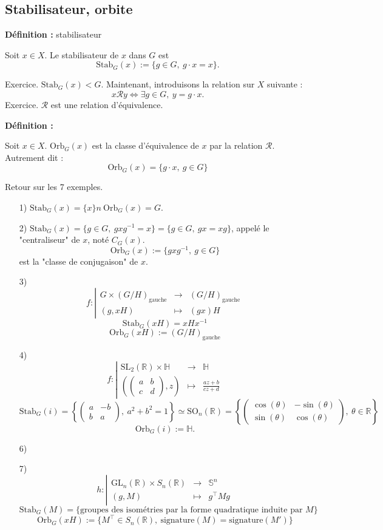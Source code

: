 \documentclass{report}
\newenvironment{definition}[1][]{
    \begin{tcolorbox}[colframe= white]
    \textbf{Définition :} 
    #1 \par
    }
    {\end{tcolorbox}}
\newcommand{\ssi}{\Longleftrightarrow}
\newcommand{\R}{\mathbb{R}}
\newcommand{\mc}{\mathcal}
\newcommand{\D}{\right}
\newcommand{\G}{\left}
\newcommand{\jus}{\ju\vspace{0.5cm}}
\newcommand{\ju}{\justify}
\newcommand{\fonctions}[5]{\begin{displaymath}#1:\left| \begin{array}{ccc}
 #2 & \longrightarrow & #3 \\
    #4 & \longmapsto & #5 \end{array}\right.\end{displaymath}}
\begin{document}
\subsection{Stabilisateur, orbite}
\jus 
\begin{definition}[stabilisateur] 
Soit $x\in X$. Le stabilisateur de $x$ dans $G$ est 
$$\text{Stab}_G(x):=\{g\in G,\ g\cdot x=x\}.$$
\end{definition}
\ju 
Exercice. $\text{Stab}_G(x)<G$. 
\jus 
Maintenant, introduisons la relation sur $X$ suivante : 
$$x\mc{R}y\ssi\exists g\in G,\ y=g\cdot x.$$
\ju 
Exercice. $\mc{R}$ est une relation d'équivalence. 
\ju 
\begin{definition}[] 
Soit $x\in X$. $\text{Orb}_G(x)$ est la classe d'équivalence de $x$ par la relation $\mc{R}$. Autrement dit : 
$$\text{Orb}_G(x)=\{g\cdot x,\ g\in G\}$$
\end{definition}
\ju 
Retour sur les 7 exemples. 
\ju 
\begin{itemize}
\item[1)] $\text{Stab}_G(x)=\{x\}n\ \text{Orb}_G(x)=G$. 
\item[2)] $\text{Stab}_G(x)=\{g\in G,\ gxg^{-1}=x\}=\{g\in G,\ gx=xg\}$, appelé le "centraliseur" de $x$, noté $C_G(x)$. 
$$\text{Orb}_G(x):=\{gxg^{-1},\ g\in G\}$$
est la "classe de conjugaison" de $x$.
\item[3)] \fonctions{f}{G\times (G/H)_{\text{gauche}}}{(G/H)_{\text{gauche}}}{(g,xH)}{(gx)H}
$$\text{Stab}_G(xH)=xHx^{-1}$$
$$\text{Orb}_G(xH):=(G/H)_{\text{gauche}}$$
\item[4)] \fonctions{f}{\text{SL}_2(\R)\times \mathbb{H}}{\mathbb{H}}{\G(\begin{pmatrix}a&b\\ c&d\end{pmatrix} ,z\D)}{\frac{az+b}{cz+d}}
$$\text{Stab}_G(i)=\G\{\begin{pmatrix}a&-b\\ b&a\end{pmatrix},\ a^2+b^2=1\D\}\simeq \text{SO}_n(\R)=\G\{\begin{pmatrix}\cos(\theta)&-\sin(\theta)\\ \sin(\theta)&\cos(\theta)\end{pmatrix},\ \theta\in\R\D\}$$
$$\text{Orb}_G(i):=\mathbb{H}.$$
\item[6)]
\item[7)] \fonctions{h}{\text{GL}_n(\R)\times S_n(\R)}{\mathbb{S}^n}{(g,M)}{g^{\top}Mg}
$$\text{Stab}_G(M)=\{\text{groupes des isométries par la forme quadratique induite par }M\}$$
$$\text{Orb}_G(xH):=\{M^{\top}\in S_n(\R),\ \text{signature}(M)=\text{signature}(M')\}$$
\end{itemize} 
\end{document}
